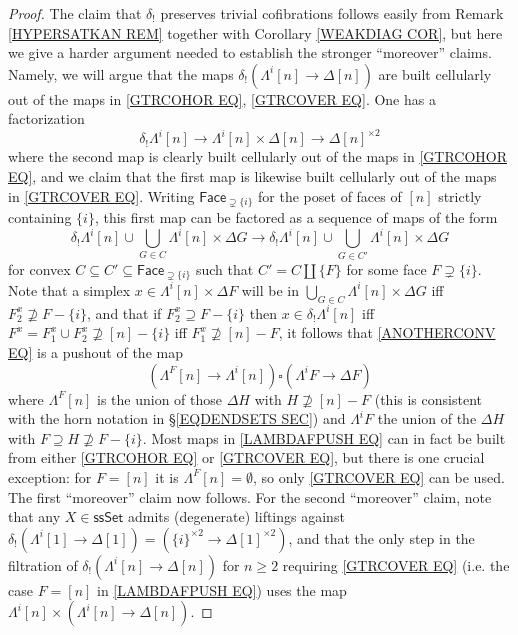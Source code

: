 \documentclass[a4paper,10pt
 ,draft
]{article}%
\begin{document}
\begin{proof}
The claim that $\delta_!$ preserves trivial cofibrations follows easily from Remark \ref{HYPERSATKAN REM} together with Corollary \ref{WEAKDIAG COR}, but here we give a harder argument needed to establish the stronger ``moreover'' claims.
Namely, we will argue that the maps
$\delta_! \left( \Lambda^i[n] \to \Delta[n]\right)$
are built cellularly out of the maps in 
\eqref{GTRCOHOR EQ}, \eqref{GTRCOVER EQ}.
One has a factorization
\[
	\delta_! \Lambda^i[n] \to
	\Lambda^i[n] \times \Delta[n] \to \Delta[n]^{\times 2}
\]
where the second map is clearly built cellularly out of the maps in 
\eqref{GTRCOHOR EQ}, and we claim that 
the first map is likewise built cellularly out of the maps in \eqref{GTRCOVER EQ}.
Writing $\mathsf{Face}_{\supsetneq \{i\}}$ for the poset
of faces of $[n]$ strictly containing $\{i\}$, this first map 
can be factored as a sequence of maps of the form
\begin{equation}\label{ANOTHERCONV EQ}
\delta_! \Lambda^i[n] \cup \bigcup_{G \in C} \Lambda^i[n] \times \Delta G
\to
\delta_! \Lambda^i[n] \cup \bigcup_{G \in C'} \Lambda^i[n] \times \Delta G
\end{equation}
for convex
$C \subseteq C' \subseteq \mathsf{Face}_{\supsetneq \{i\}}$ such that $C' = C \amalg \{F\}$ for some face $F\supsetneq \{i\}$.
Note that a simplex 
$x \in \Lambda^i[n] \times \Delta F$
will be in $\bigcup_{G \in C} \Lambda^i[n] \times \Delta G$ iff 
$F_2^x \not \supseteq F-\{i\}$, 
and that if 
$F_2^x \supseteq F-\{i\}$
then $x \in \delta_! \Lambda^i[n]$ 
iff $F^x=F_1^x \cup F_2^x \not \supseteq [n] - \{i\}$
iff $F_1^x \not \supseteq [n] - F$,
it follows that \eqref{ANOTHERCONV EQ} is a pushout of the map
\begin{equation}\label{LAMBDAFPUSH EQ}
	\left(\Lambda^{F}[n] \to \Lambda^i[n] \right)
		\square
	\left(\Lambda^{i}F \to \Delta F \right)
\end{equation}
where $\Lambda^{F}[n]$ is the union of those $\Delta H$ with $H \not \supseteq [n] - F$ (this is consistent with the horn notation in \S \ref{EQDENDSETS SEC})
and $\Lambda^i F$ the union of the $\Delta H$ with $F \supseteq H \not \supseteq F - \{i\}$.
Most maps in \eqref{LAMBDAFPUSH EQ}
can in fact be built from either \eqref{GTRCOHOR EQ} or \eqref{GTRCOVER EQ}, but there is one crucial exception:
for $F=[n]$ it is $\Lambda^F[n]=\emptyset$, 
so only \eqref{GTRCOVER EQ} can be used.
The first ``moreover'' claim now follows. For the second ``moreover'' claim, note that any $X \in \mathsf{ssSet}$ admits (degenerate) liftings against 
$\delta_!\left(\Lambda^i[1] \to \Delta[1]\right) =
 \left(\{i\}^{\times 2} \to \Delta[1]^{\times 2}\right)$,
and that the only step in the filtration of 
$\delta_!\left( \Lambda^i[n] \to \Delta[n]\right)$ for $n\geq 2$
requiring \eqref{GTRCOVER EQ} (i.e. the case $F=[n]$ in \eqref{LAMBDAFPUSH EQ})
uses the map
$\Lambda^i[n] \times \left(\Lambda^i[n] \to \Delta[n] \right)$.



\end{proof}
\end{document}
